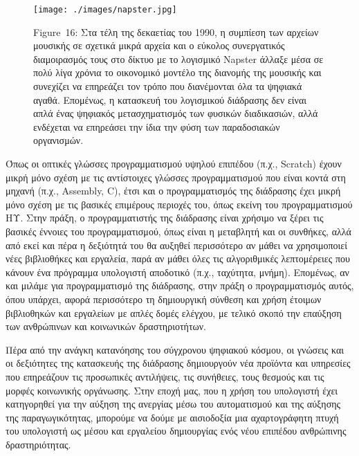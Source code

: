 \documentclass[
]{article}
\begin{document}
\leavevmode{}%
\begin{figure}
\hypertarget{fig:napster}{%
\centering
\texttt{[image: ./images/napster.jpg]}
\caption{Figure~16: Στα τέλη της δεκαετίας του 1990, η συμπίεση των
αρχείων μουσικής σε σχετικά μικρά αρχεία και ο εύκολος συνεργατικός
διαμοιρασμός τους στο δίκτυο με το λογισμικό Napster άλλαξε μέσα σε πολύ
λίγα χρόνια το οικονομικό μοντέλο της διανομής της μουσικής και
συνεχίζει να επηρεάζει τον τρόπο που διανέμονται όλα τα ψηφιακά αγαθά.
Επομένως, η κατασκευή του λογισμικού διάδρασης δεν είναι απλά ένας
ψηφιακός μετασχηματισμός των φυσικών διαδικασιών, αλλά ενδέχεται να
επηρεάσει την ίδια την φύση των παραδοσιακών
οργανισμών.}\label{fig:napster}
}
\end{figure}

Όπως οι οπτικές γλώσσες προγραμματισμού υψηλού επιπέδου (π.χ., Scratch)
έχουν μικρή μόνο σχέση με τις αντίστοιχες γλώσσες προγραμματισμού που
είναι κοντά στη μηχανή (π.χ., Assembly, C), έτσι και ο προγραμματισμός
της διάδρασης έχει μικρή μόνο σχέση με τις βασικές επιμέρους περιοχές
του, όπως εκείνη του προγραμματισμού ΗΥ. Στην πράξη, ο προγραμματιστής
της διάδρασης είναι χρήσιμο να ξέρει τις βασικές έννοιες του
προγραμματισμού, όπως είναι η μεταβλητή και οι συνθήκες, αλλά από εκεί
και πέρα η δεξιότητά του θα αυξηθεί περισσότερο αν μάθει να χρησιμοποιεί
νέες βιβλιοθήκες και εργαλεία, παρά αν μάθει όλες τις αλγοριθμικές
λεπτομέρειες που κάνουν ένα πρόγραμμα υπολογιστή αποδοτικό (π.χ.,
ταχύτητα, μνήμη). Επομένως, αν και μιλάμε για προγραμματισμό της
διάδρασης, στην πράξη ο προγραμματισμός αυτός, όπου υπάρχει, αφορά
περισσότερο τη δημιουργική σύνθεση και χρήση έτοιμων βιβλιοθηκών και
εργαλείων με απλές δομές ελέγχου, με τελικό σκοπό την επαύξηση των
ανθρώπινων και κοινωνικών δραστηριοτήτων.

Πέρα από την ανάγκη κατανόησης του σύγχρονου ψηφιακού κόσμου, οι γνώσεις
και οι δεξιότητες της κατασκευής της διάδρασης δημιουργούν νέα προϊόντα
και υπηρεσίες που επηρεάζουν τις προσωπικές αντιλήψεις, τις συνήθειες,
τους θεσμούς και τις μορφές κοινωνικής οργάνωσης. Στην εποχή μας, που η
χρήση του υπολογιστή έχει κατηγορηθεί για την αύξηση της ανεργίας μέσω
του αυτοματισμού και της αύξησης της παραγωγικότητας, μπορούμε να δούμε
με αισιοδοξία μια αχαρτογράφητη πτυχή του υπολογιστή ως μέσου και
εργαλείου δημιουργίας ενός νέου επιπέδου ανθρώπινης δραστηριότητας.
\end{document}

